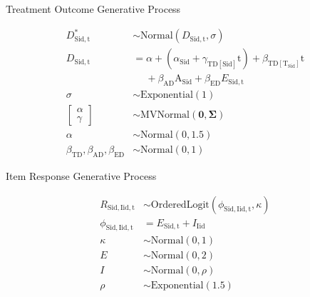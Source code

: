 \documentclass[12pt,preview,border=5mm]{standalone}
\begin{document}
 

\newcommand{\midx}[2]{ \mathrm{#1},\mathrm{#2} }
\newcommand{\aidx}[3]{ \mathrm{#1},\mathrm{#2},\mathrm{#3} }
\newcommand{\vidx}[1]{ \mathrm{#1} }
\newcommand{\annot}[1]{ \begin{center} {\scriptsize #1} \end{center}}
\newcommand{\bb}[1]{ \beta_{\mathrm{#1}} }
\newcommand{\gm}[1]{ \gamma_{\mathrm{#1}} }

\annot{Treatment Outcome Generative Process}
\begin{equation}
    \begin{aligned}
       D^{\ast}_{\midx{Sid}{t}}                       & \sim \text{Normal}( D_{\midx{Sid}{t}}, \sigma )                       \\
       D_{\midx{Sid}{t}}                              & = \alpha + (\alpha_{\vidx{Sid}} + \gm{TD[\vidx{Sid}]} \text{t}) + \bb{TD [T_{\vidx{Sid}}]} \text{t} \\
                                                      & \phantom{PP} + \bb{AD} \text{A}_{\vidx{Sid}} + \bb{ED} E_{\midx{Sid}{t}} \\
       \sigma                                         & \sim \text{Exponential}(1) \\
       \begin{bmatrix} \alpha \\ \gamma \end{bmatrix} & \sim \text{MVNormal}(\pmb{0}, \pmb{\Sigma}) \\
       \alpha                                         & \sim \text{Normal}(0, 1.5) \\
       \bb{TD}, \bb{AD}, \bb{ED}                      & \sim \text{Normal}(0, 1)
    \end{aligned}
\end{equation}
 
\annot{Item Response Generative Process}
\begin{equation}
    \begin{aligned}
       R_{\aidx{Sid}{Iid}{t}}    &\sim \text{OrderedLogit}( \phi_{\aidx{Sid}{Iid}{t}}, \kappa )    \\
       \phi_{\aidx{Sid}{Iid}{t}} &= E_{\midx{Sid}{t}} + I_{\vidx{Iid}}                           \\
       \kappa               &\sim \text{Normal}(0, 1)         \\
       E                    &\sim \text{Normal}(0, 2)         \\
       I                    &\sim \text{Normal}(0, \rho)      \\
       \rho                 &\sim \text{Exponential}(1.5)
    \end{aligned}
\end{equation}
 
\end{document}
